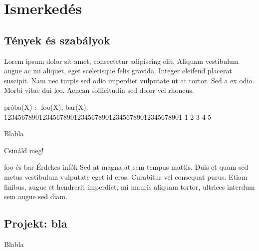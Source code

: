 
\chapter{Ismerkedés}
\section{Tények és szabályok}
 Lorem ipsum dolor sit amet, consectetur
 adipiscing elit. Aliquam vestibulum augue ac mi
 aliquet, eget scelerisque felis gravida. Integer
 eleifend placerat suscipit. Nam nec turpis sed
 odio imperdiet vulputate ut at tortor. Sed a ex
 odio. Morbi vitae dui leo. Aenean sollicitudin
 sed dolor vel rhoncus.

\begin{prolog}
próba(X) :- foo(X), bar(X).
123456789012345678901234567890123456789012345678901
         1         2         3         4         5 
\end{prolog}
Blabla
\begin{problem}
  Csináld meg!
\end{problem}
\begin{infobox}{foo és bar}
  Érdekes infók Sed at magna at sem tempus
  mattis. Duis et quam sed metus vestibulum
  vulputate eget id eros. Curabitur vel consequat
  purus. Etiam finibus, augue et hendrerit
  imperdiet, mi mauris aliquam tortor, ultrices
  interdum sem augue sed diam.
\end{infobox}
\section{Projekt: bla}
Blabla
